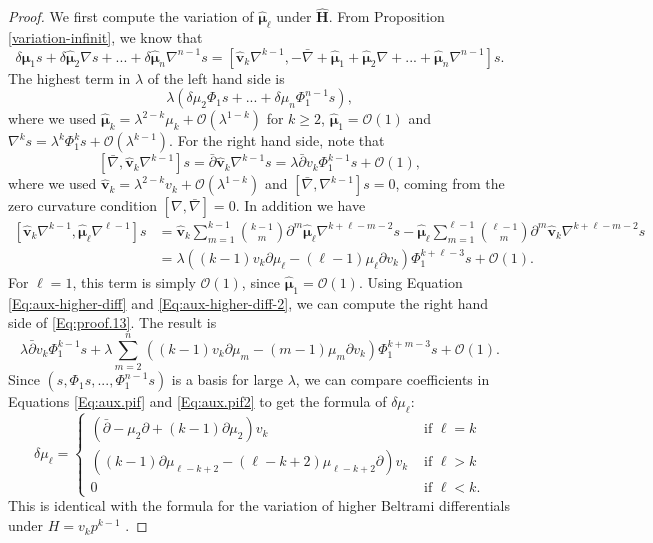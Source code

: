 \documentclass[11pt]{amsart}
\numberwithin{thm}{section} %
\numberwithin{equation}{section} %
\numberwithin{figure}{section} %
\renewcommand*{\l}{\lambda}
\begin{document}
\begin{proof}
We first compute the variation of $\bm\hat{\mu}_\ell$ under $\bm\hat{H}$. From Proposition \ref{variation-infinit}, we know that
\begin{equation}\label{Eq:proof.13}
\delta\bm\hat{\mu}_1 s+\delta\bm\hat{\mu}_2 \nabla s+...+\delta\bm\hat{\mu}_n \nabla^{n-1}s = [\bm\hat{v}_k\nabla^{k-1},-\bar\nabla+\bm\hat{\mu}_1+\bm\hat{\mu}_2\nabla+...+\bm\hat{\mu}_n\nabla^{n-1}]s.
\end{equation}
The highest term in $\lambda$ of the left hand side is 
\begin{equation}\label{Eq:aux.pif}
\lambda(\delta\mu_2 \Phi_1s+...+\delta\mu_n \Phi_1^{n-1}s),
\end{equation}
where we used $\bm\hat{\mu}_k=\l^{2-k}\mu_k+\mathcal{O}(\l^{1-k})$ for $k\geq 2$, $\bm\hat{\mu}_1=\mathcal{O}(1)$ and $\nabla^k s=\l^k\Phi_1^k s+\mathcal{O}(\l^{k-1})$. For the right hand side, note that
\begin{equation}\label{Eq:aux-higher-diff}
[\bar\nabla,\bm\hat{v}_k\nabla^{k-1}]s = \bar\partial \bm\hat{v}_k\nabla^{k-1} s = \l \bar\partial v_k \Phi_1^{k-1}s+\mathcal{O}(1),
\end{equation}
where we used $\bm\hat{v}_k=\l^{2-k}v_k+\mathcal{O}(\l^{1-k})$ and $[\bar\nabla,\nabla^{k-1}]s=0$, coming from the zero curvature condition $[\nabla,\bar\nabla]=0$. In addition we have
\begin{align}\label{Eq:aux-higher-diff-2}
[\bm\hat{v}_k\nabla^{k-1},\bm\hat{\mu}_\ell \nabla^{\ell-1}]s &= \bm\hat{v}_k\sum_{m=1}^{k-1}\binom{k-1}{m}\partial^m\bm\hat{\mu}_\ell \nabla^{k+\ell-m-2}s-\bm\hat{\mu}_\ell\sum_{m=1}^{\ell-1}\binom{\ell-1}{m}\partial^m \bm\hat{v}_k\nabla^{k+\ell-m-2}s  \nonumber \\
&= \l((k-1)v_k\partial\mu_\ell-(\ell-1)\mu_\ell\partial v_k)\Phi_1^{k+\ell-3}s+\mathcal{O}(1).
\end{align}
For $\ell=1$, this term is simply $\mathcal{O}(1)$, since $\bm\hat{\mu}_1=\mathcal{O}(1)$.
Using Equation \eqref{Eq:aux-higher-diff} and \eqref{Eq:aux-higher-diff-2}, we can compute the right hand side of \eqref{Eq:proof.13}. The result is
\begin{equation}\label{Eq:aux.pif2}
\l \bar\partial v_k\Phi_1^{k-1}s+\l\sum_{m=2}^n ((k-1)v_k\partial\mu_m-(m-1)\mu_m\partial v_k)\Phi_1^{k+m-3}s+\mathcal{O}(1).
\end{equation}
Since $(s,\Phi_1s,...,\Phi_1^{n-1}s)$ is a basis for large $\l$, we can compare coefficients in Equations \eqref{Eq:aux.pif} and \eqref{Eq:aux.pif2} to get the formula of $\delta\mu_\ell$:
$$\delta \mu_\ell = \left \{ \begin{array}{cl}
(\bar{\partial}-\mu_2\partial+(k-1)\partial\mu_2)v_k & \text{ if  } \ell=k \\
((k-1)\partial\mu_{\ell-k+2}-(\ell-k+2)\mu_{\ell-k+2}\partial)v_k &\text{ if  } \ell>k \\
0 & \text{ if  } \ell <k.
\end{array} \right.$$
This is identical with the formula for the variation of higher Beltrami differentials under $H=v_kp^{k-1}$ \cite[Proposition 3]{FockThomas}.


\end{proof}
\end{document}
